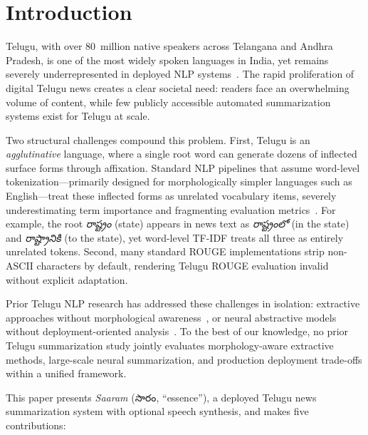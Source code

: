 \documentclass[runningheads]{llncs}
\begin{document}

\section{Introduction}

Telugu, with over 80~million native speakers across Telangana
and Andhra Pradesh, is one of the most widely spoken languages
in India, yet remains severely underrepresented in deployed NLP systems~\cite{joshi2020text}. The rapid proliferation of
digital Telugu news creates a clear societal need: readers face an overwhelming volume of content, while few publicly accessible automated summarization systems exist for Telugu at scale.

Two structural challenges compound this problem. First, Telugu
is an \emph{agglutinative} language, where a single root word can generate dozens of inflected surface forms through affixation. Standard NLP
pipelines that assume word-level tokenization—primarily designed for
morphologically simpler languages such as English—treat these
inflected forms as unrelated vocabulary items, severely
underestimating term importance and fragmenting evaluation
metrics~\cite{singh2020text}. For example, the root
\textit{{\telugufont రాష్ట్రం}} (state) appears in news text as
\textit{{\telugufont రాష్ట్రంలో}} (in the state) and
\textit{{\telugufont రాష్ట్రానికి}} (to the state), yet
word-level TF-IDF treats all three as entirely unrelated tokens.
Second, many standard ROUGE implementations strip non-ASCII characters by default, rendering Telugu ROUGE evaluation invalid without explicit adaptation.

Prior Telugu NLP research has addressed these challenges in
isolation: extractive approaches without morphological
awareness~\cite{anandbabu2023extractive}, or neural
abstractive models without deployment-oriented
analysis~\cite{srinivasa2019neural}. To the best of our knowledge,
no prior Telugu summarization study jointly evaluates
morphology-aware extractive methods, large-scale neural
summarization, and production deployment trade-offs within a unified framework.

This paper presents \textit{Saaram} ({\telugufont సారం}, ``essence''), a
deployed Telugu news summarization system with optional speech synthesis, and makes five contributions:
\end{document}
